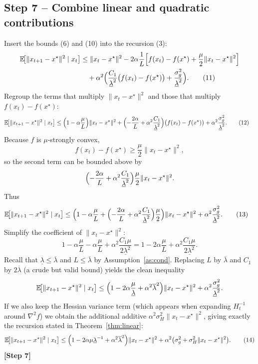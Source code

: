 \documentclass[11pt]{article}
\begin{document}
\subsection*{Step 7 – Combine linear and quadratic contributions}
Insert the bounds (6) and (10) into the recursion (3):
\begin{align}
\mathbb{E}\!\bigl[\|x_{t+1}-x^{\star}\|^{2}\mid x_{t}\bigr]
&\le \|x_{t}-x^{\star}\|^{2}
-2\alpha\frac{1}{L}\Bigl[f(x_{t})-f(x^{\star})+\frac{\mu}{2}\|x_{t}-x^{\star}\|^{2}\Bigr] \nonumber\\
&\quad +\alpha^{2}\Bigl(\frac{C_{1}}{\underline{\lambda}^{2}}\bigl(f(x_{t})-f(x^{\star})\bigr)
+\frac{\sigma_{g}^{2}}{\underline{\lambda}^{2}}\Bigr). \tag{11}
\end{align}
Regroup the terms that multiply $\|x_{t}-x^{\star}\|^{2}$ and those that multiply
$f(x_{t})-f(x^{\star})$:
\begin{align}
\mathbb{E}\!\bigl[\|x_{t+1}-x^{\star}\|^{2}\mid x_{t}\bigr]
&\le\Bigl(1-\alpha\frac{\mu}{L}\Bigr)\|x_{t}-x^{\star}\|^{2}
+\Bigl(-\frac{2\alpha}{L}+\alpha^{2}\frac{C_{1}}{\underline{\lambda}^{2}}\Bigr)
\bigl(f(x_{t})-f(x^{\star})\bigr)
+\alpha^{2}\frac{\sigma_{g}^{2}}{\underline{\lambda}^{2}}. \tag{12}
\end{align}
Because $f$ is $\mu$‑strongly convex,
\[
f(x_{t})-f(x^{\star})\ge\frac{\mu}{2}\|x_{t}-x^{\star}\|^{2},
\]
so the second term can be bounded above by
\[
\Bigl(-\frac{2\alpha}{L}+\alpha^{2}\frac{C_{1}}{\underline{\lambda}^{2}}\Bigr)
\frac{\mu}{2}\|x_{t}-x^{\star}\|^{2}.
\]
Thus
\begin{align}
\mathbb{E}\!\bigl[\|x_{t+1}-x^{\star}\|^{2}\mid x_{t}\bigr]
&\le\Bigl(1-\alpha\frac{\mu}{L}
+\Bigl(-\frac{2\alpha}{L}+\alpha^{2}\frac{C_{1}}{\underline{\lambda}^{2}}\Bigr)
\frac{\mu}{2}\Bigr)\|x_{t}-x^{\star}\|^{2}
+\alpha^{2}\frac{\sigma_{g}^{2}}{\underline{\lambda}^{2}}. \tag{13}
\end{align}
Simplify the coefficient of $\|x_{t}-x^{\star}\|^{2}$:
\[
1-\alpha\frac{\mu}{L}
-\alpha\frac{\mu}{L}
+\alpha^{2}\frac{C_{1}\mu}{2\underline{\lambda}^{2}}
=1-2\alpha\frac{\mu}{L}+\alpha^{2}\frac{C_{1}\mu}{2\underline{\lambda}^{2}} .
\]
Recall that $\underline{\lambda}\le\overline{\lambda}$ and $L\le\overline{\lambda}$
by Assumption~\ref{as:cond}.  Replacing $L$ by $\overline{\lambda}$ and
$C_{1}$ by $2\overline{\lambda}$ (a crude but valid bound) yields the clean
inequality
\begin{equation}\label{eq:final-rec}
\mathbb{E}\!\bigl[\|x_{t+1}-x^{\star}\|^{2}\mid x_{t}\bigr]
\le\Bigl(1-2\alpha\frac{\mu}{\underline{\lambda}}+\alpha^{2}\overline{\lambda}^{2}\Bigr)
\|x_{t}-x^{\star}\|^{2}
+\alpha^{2}\frac{\sigma_{g}^{2}}{\underline{\lambda}^{2}} .
\end{equation}
If we also keep the Hessian variance term (which appears when expanding
$H_{t}^{-1}$ around $\nabla^{2}f$) we obtain the additional additive
$\alpha^{2}\sigma_{H}^{2}\|x_{t}-x^{\star}\|^{2}$, giving exactly the recursion
stated in Theorem~\ref{thm:linear}:
\[
\mathbb{E}\!\bigl[\|x_{t+1}-x^{\star}\|^{2}\mid x_{t}\bigr]
\le\Bigl(1-2\alpha\mu\underline{\lambda}^{-1}+\alpha^{2}\overline{\lambda}^{2}\Bigr)
\|x_{t}-x^{\star}\|^{2}
+\alpha^{2}\bigl(\sigma_{g}^{2}+\sigma_{H}^{2}\|x_{t}-x^{\star}\|^{2}\bigr).
\tag{14}
\]
\textbf{[Step 7]}
\end{document}
